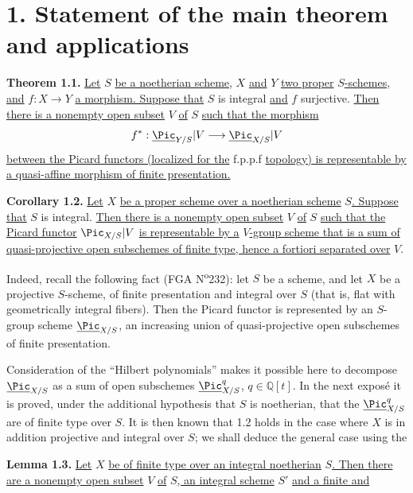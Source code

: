 %
\section*{1. Statement of the main theorem and applications}

\textbf{Theorem 1.1.} \uline{Let} \(S\) \uline{be a noetherian scheme,} \(X\) \uline{and} \(Y\) \uline{two proper} \(S\)\uline{-schemes, and} \(f:X\to Y\) \uline{a morphism. Suppose that} \(S\) is integral \uline{and} \(f\) surjective. \uline{Then there is a nonempty open subset} \(V\) \uline{of} \(S\) \uline{such that the morphism}
\[
  f^*:\underline{\Pic}_{Y/S}|V\longrightarrow \underline{\Pic}_{X/S}|V
\]
\uline{between the Picard functors (localized for the} f.p.p.f \uline{topology) is representable by a quasi-affine morphism of finite presentation.}

\textbf{Corollary 1.2.} \uline{Let} \(X\) \uline{be a proper scheme over a noetherian scheme} \(S\)\uline{. Suppose that} \(S\) is integral. \uline{Then there is a nonempty open subset} \(V\) \uline{of} \(S\) \uline{such that the Picard functor} \(\Pic_{X/S}|V\) \uline{is representable by a} \(V\)\uline{-group scheme that is a sum of quasi-projective open subschemes of finite type, hence a fortiori separated over} \(V\).

Indeed, recall the following fact (FGA N\textsuperscript{o}232): let \(S\) be a scheme, and let \(X\) be a projective \(S\)-scheme, of finite presentation and integral over \(S\) (that is, flat with geometrically integral fibers). Then the Picard functor is represented by an \(S\)-group scheme \(\underline{\Pic}_{X/S}\), an increasing union of quasi-projective open subschemes of finite presentation.

Consideration of the ``Hilbert polynomials'' makes it possible here to decompose \(\underline{\Pic}_{X/S}\) as a sum of open subschemes \(\underline{\Pic}^q_{X/S}\), \(q\in\mathbb Q[t]\). In the next exposé it is proved, under the additional hypothesis that \(S\) is noetherian, that the \(\underline{\Pic}^q_{X/S}\) are of finite type over \(S\). It is then known that 1.2 holds in the case where \(X\) is in addition projective and integral over \(S\); we shall deduce the general case using the

\textbf{Lemma 1.3.} \uline{Let} \(X\) \uline{be of finite type over an integral noetherian} \(S\)\uline{. Then there are a nonempty open subset} \(V\) \uline{of} \(S\)\uline{, an integral scheme} \(S'\) \uline{and a finite and}


